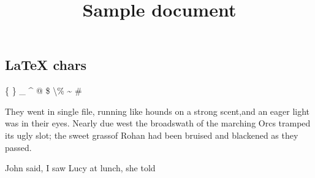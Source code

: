 \documentclass{report}
\title{Sample document}
\begin{document}
\maketitle
 \subsection*{LaTeX chars} \par \{ \} \_ \^{} @ \$ \textbackslash \% \~{} \#
\par \begin{center}
They went in single file, running like hounds on a strong scent,and an eager light was in their eyes. Nearly due west the broadswath of the marching \small Orcs tramped\normalsize 
its ugly slot; the sweet grassof Rohan had been bruised and blackened as they passed.\end{center}

\par John said, I saw Lucy at lunch, she told
\end{document}
